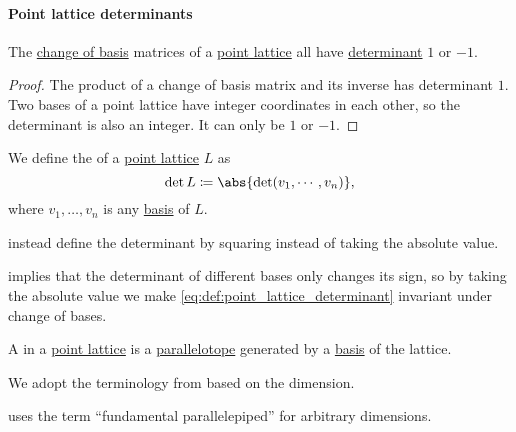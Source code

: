 \paragraph{Point lattice determinants}

\begin{proposition}\label{thm:point_lattice_determinant}
  The \hyperref[con:change_of_basis]{change of basis} matrices of a \hyperref[def:point_lattice]{point lattice} all have \hyperref[def:matrix_determinant]{determinant} \( 1 \) or \( -1 \).
\end{proposition}
\begin{proof}
  The product of a change of basis matrix and its inverse has determinant \( 1 \). Two bases of a point lattice have integer coordinates in each other, so the determinant is also an integer. It can only be \( 1 \) or \( -1 \).
\end{proof}

\begin{definition}\label{def:point_lattice_determinant}
  We define the  of a \hyperref[def:point_lattice]{point lattice} \( L \) as
  \begin{equation}\label{eq:def:point_lattice_determinant}
    \det L \coloneqq \abs{ \det(v_1, \cdots, v_n) },
  \end{equation}
  where \( v_1, \ldots, v_n \) is any \hyperref[def:point_lattice_basis]{basis} of \( L \).
\end{definition}
\begin{comments}
  \item {} instead define the determinant by squaring instead of taking the absolute value.
\end{comments}
\begin{defproof}
   implies that the determinant of different bases only changes its sign, so by taking the absolute value we make \eqref{eq:def:point_lattice_determinant} invariant under change of bases.
\end{defproof}

\begin{definition}\label{def:fundamental_paralellotope}
  A  in a \hyperref[def:point_lattice]{point lattice} is a \hyperref[def:parallelotope]{parallelotope} generated by a \hyperref[def:point_lattice_basis]{basis} of the lattice.

  We adopt the terminology from  based on the dimension.
\end{definition}
\begin{comments}
  \item {} uses the term \enquote{fundamental parallelepiped} for arbitrary dimensions.
\end{comments}

